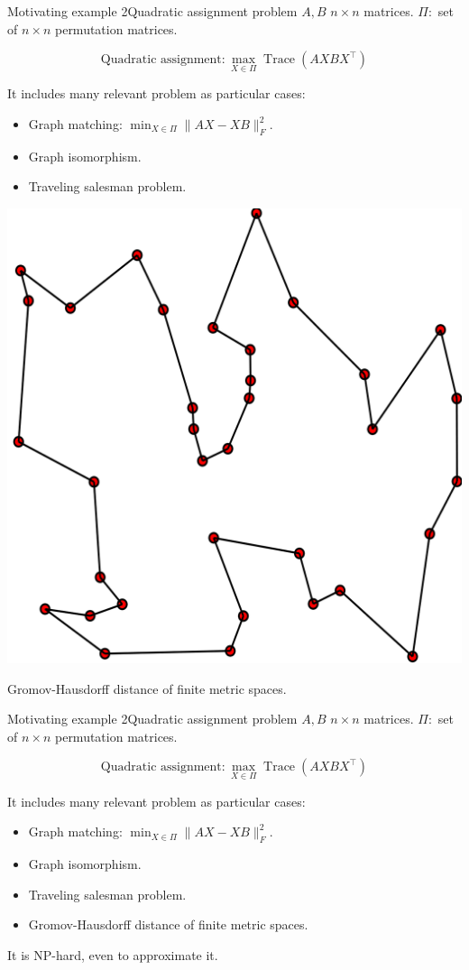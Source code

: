 \documentclass{beamer}
\begin{document}
\begin{frame}{Motivating example 2}{Quadratic assignment problem}
$A,B$ $n\times n$ matrices. $\Pi:$ set of $n\times n$ permutation matrices.

$$\text{Quadratic assignment}: \max_{X\in \Pi} \operatorname{Trace}(AXBX^\top)$$
\smallskip

It includes many relevant problem as particular cases:
\begin{itemize}
\item Graph matching: $\min_{X\in \Pi} \|AX-XB\|_F^2$.
\item Graph isomorphism.
\item Traveling salesman problem.
\end{itemize}
\begin{center}
\includegraphics[height=.17\textwidth]{figs/tsp.png} \end{center}


\color{white}

Gromov-Hausdorff distance of finite metric spaces.
\end{frame}

\begin{frame}{Motivating example 2}{Quadratic assignment problem}
$A,B$ $n\times n$ matrices. $\Pi:$ set of $n\times n$ permutation matrices.

$$\text{Quadratic assignment}: \max_{X\in \Pi} \operatorname{Trace}(AXBX^\top)$$
\smallskip

It includes many relevant problem as particular cases:
\begin{itemize}
\item Graph matching: $\min_{X\in \Pi} \|AX-XB\|_F^2$.
\item Graph isomorphism.
\item Traveling salesman problem.
\item Gromov-Hausdorff distance of finite metric spaces.
\end{itemize}

\vspace{0.09\textwidth}

It is NP-hard, even to approximate it.
\vspace{0.1\textwidth}
\end{frame}
\end{document}
